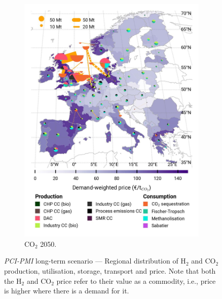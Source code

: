 \documentclass[pdflatex,sn-nature]{sn-jnl}
\theoremstyle{thmstyleone}%
\theoremstyle{thmstyletwo}%
\theoremstyle{thmstylethree}%
\begin{document}
\begin{figure}[htbp]
\begin{subfigure}[t]{0.32\textwidth}
      \includegraphics[width=1\textwidth]{figures/pci___base_s_adm___2050-balance_map_co2_stored.jpg} 
      \caption{CO$_2$ 2050.}
      \label{fig:PCI_lt_2050_co2}
  \end{subfigure}
  \vspace{0.3cm}
  \caption{\textit{PCI-PMI} long-term scenario --- Regional distribution of H$_2$ and CO$_2$ production, utilisation, storage, transport and price. Note that both the H$_2$ and CO$_2$ price refer to their value as a commodity, i.e., price is higher where there is a demand for it.}
  \label{fig:PCI_lt}
\end{figure}

\clearpage
\end{document}
